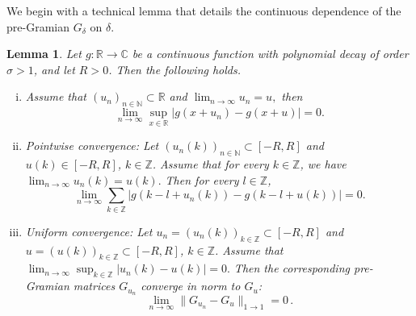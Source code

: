 \documentclass[reqno,a4paper,12pt]{amsart}
\numberwithin{equation}{section}
\newtheorem{lemma}[definition]{Lemma}
\def\N{{\mathbb N}}
\def\Z{{\mathbb Z}}
\def\R{{\mathbb R}}
\newcommand\1{\mathds{1}}
\begin{document}
We begin with a technical lemma that details the continuous dependence
of the pre-Gramian $G_\delta $ on $\delta $. 
\begin{lemma}\label{lem:uniformcontinuity}
Let $g:\mathbb R\to\mathbb C$ be a continuous function with polynomial
decay of order $\sigma>1$, and  let $R>0$. Then the following holds.

\begin{enumerate}[(i)]
\item Assume that  $(u_n)_{n\in\mathbb N}\subset \R$  and $
  \lim_{n\to\infty}u_n=u, $
then
\begin{equation}
  \label{eq:c6}
\lim_{n\to\infty}
\sup_{x\in\mathbb R}|g(x+u_n)-g(x+u)|=0.
\end{equation}
\item Pointwise convergence:   Let $(u_n(k))_{n \in \N} \subset [-R,R]$ and $u(k) \in [-R,R]$, $k \in \Z$. Assume that for every $k\in\mathbb Z$, we have
$
\lim_{n\to\infty}u_n(k)=u(k).
$
Then for every $l\in\mathbb Z$,
\begin{equation}
  \label{eq:c9}
\lim_{n\to\infty}
\sum_{k\in\mathbb Z}
|g(k-l+u_n(k))-g(k-l+u(k))|
=0.
\end{equation}
\item Uniform convergence:  Let $ u_n = (u_n(k))_{k \in \Z} \subset
  [-R,R]$ and $u = (u(k))_{k\in \Z}  \subset  [-R,R]$, $k \in
  \Z$. Assume that 
$
\lim_{n\to\infty} \sup _{k\in \Z } |u_n(k)-u(k)| = 0.
$
Then the corresponding pre-Gramian matrices $G_{u_n}$ converge in norm
to $G_u$:
$$
\lim _{n\to \infty } \|G_{u_n} - G_u\|_{1 \to 1}  = 0 \, .
$$
\end{enumerate}
\end{lemma}
\end{document}
